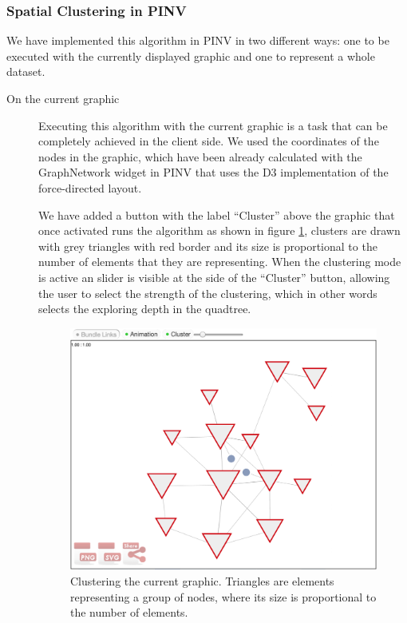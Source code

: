 \subsubsection{Spatial Clustering in PINV}
We have implemented this algorithm in PINV in two different ways: one to be executed with the currently displayed graphic and one to represent a whole dataset.

\begin{description}
\item[On the current graphic]
Executing this algorithm with the current graphic is a task that can be completely achieved in the client side. We used the coordinates of the nodes in the graphic, which have been already calculated with the GraphNetwork widget in PINV that uses the D3 implementation of the force-directed layout. 

We have added a button with the label ``Cluster'' above the graphic that once activated runs the algorithm as shown in figure \ref{fig:local_cluster}, clusters are drawn with grey triangles with red border and its size is proportional to the number of elements that they are representing. When the clustering mode is active an slider is visible at the side of the ``Cluster'' button, allowing the user to select the strength of the clustering, which in other words selects the exploring depth  in the quadtree.

\begin{figure}[ht]
\centering
\includegraphics[width=\textwidth]{figures/local_cluster.png}
\caption[Clustering the current graphic.]{Clustering the current graphic. Triangles are elements representing a group of nodes, where its size is proportional to the number of elements.
\label{fig:local_cluster}}
\end{figure}


\end{description}
